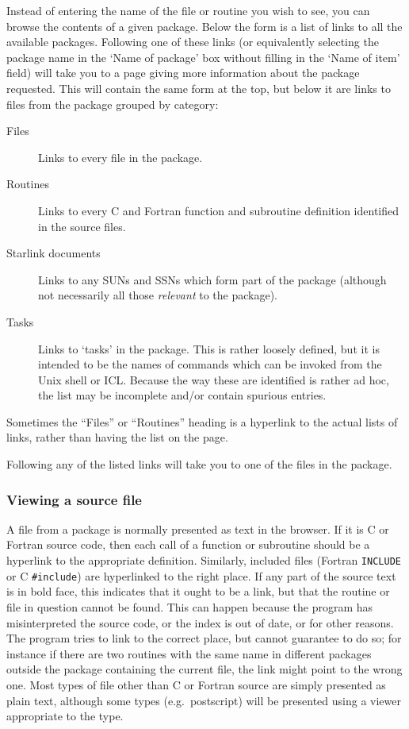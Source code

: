 \documentclass[twoside,11pt]{article}
\newcommand{\xlabel}[1]{}
\renewcommand{\_}{\texttt{\symbol{95}}}
\begin{document}
Instead of entering the name of the file or routine you wish to
see, you can browse the contents of a given package.
Below the form is a list of links to all the available packages.
Following one of these links (or equivalently selecting the package
name in the `Name of package' box without filling in the `Name of item'
field) will take you to a page giving more information about the
package requested.
This will contain the same form at the top,
but below it are links to files from the package grouped by category:
\begin{description}
\item[Files]
Links to every file in the package.
\item[Routines]
Links to every C and Fortran function and subroutine definition
identified in the source files.
\item[Starlink documents]
Links to any SUNs and SSNs which form part of the package
(although not necessarily all those {\it relevant\/} to the package).
\item[Tasks]
Links to `tasks' in the package.
This is rather loosely defined, but it is intended to be
the names of commands which can be invoked from the Unix shell or ICL.
Because the way these are identified is rather ad hoc,
the list may be incomplete and/or contain spurious entries.
\end{description}
Sometimes the ``Files'' or ``Routines'' heading is a hyperlink to
the actual lists of links, rather than having the list on the page.

Following any of the listed links
will take you to one of the files in the package.

\subsubsection{\xlabel{sec:view}\label{sec:view}Viewing a source file}

A file from a package is normally presented as text in the browser.
If it is C or Fortran source code, then each call of a function or
subroutine should be a hyperlink to the appropriate definition.
Similarly, included files (Fortran {\tt INCLUDE} or C {\tt \#include})
are hyperlinked to the right place.
If any part of the source text is in bold face,
this indicates that it ought to be a link,
but that the routine or file in question cannot be found.
This can happen because the program has misinterpreted the source code,
or the index is out of date, or for other reasons.
The program tries to link to the correct place,
but cannot guarantee to do so; for instance if there are two
routines with the same name in different packages outside the
package containing the current file, the link might point to
the wrong one.
Most types of file other than C or Fortran source are
simply presented as plain text, although some types
(e.g.\ postscript)
will be presented using a viewer appropriate to the type.
\end{document}
